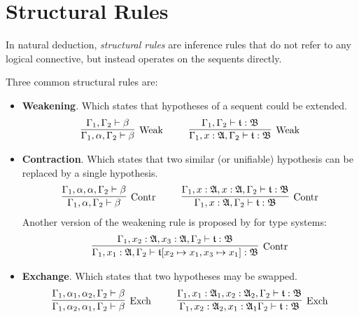 \section{Structural Rules}

In natural deduction, \textit{structural rules} are inference rules that do not refer to any logical connective, but instead operates on the sequents directly.

Three common structural rules are:
\begin{itemize}
    \item \textbf{Weakening}. Which states that hypotheses of a sequent could be extended.
    \begin{gather*}
        \infer[\mbox{Weak}]{\Gamma_1, \alpha, \Gamma_2 \vdash \beta}{\Gamma_1, \Gamma_2 \vdash \beta}
        ~~~~ ~~~~
        \infer[\mbox{Weak}]{\Gamma_1, x : \A, \Gamma_2\vdash \t : \mathfrak{B}}{\Gamma_1, \Gamma_2\vdash \t : \mathfrak{B}}
    \end{gather*}
    \item \textbf{Contraction}. Which states that two similar (or unifiable) hypothesis can be replaced by a single hypothesis.
    \begin{gather*}
        \infer[\mbox{Contr}]{\Gamma_1, \alpha, \Gamma_2 \vdash \beta}{\Gamma_1, \alpha, \alpha, \Gamma_2 \vdash \beta}
        ~~~~ ~~~~
        \infer[\mbox{Contr}]{\Gamma_1, x : \A, \Gamma_2 \vdash \t : \mathfrak{B}}{\Gamma_1, x : \A, x : \A, \Gamma_2 \vdash \t : \mathfrak{B}}
    \end{gather*}
    Another version of the weakening rule is proposed by \cite{DavidWalker2004} for type systems:
    \begin{gather*}
        \infer[\mbox{Contr}]{\Gamma_1, x_1 : \A, \Gamma_2 \vdash \t[x_2 \mapsto x_1, x_3 \mapsto x_1] : \mathfrak{B}}{\Gamma_1, x_2 : \A, x_3 : \A, \Gamma_2 \vdash \t : \mathfrak{B}}
    \end{gather*}
    \item \textbf{Exchange}. Which states that two hypotheses may be swapped.
    \begin{gather*}
        \infer[\mbox{Exch}]{\Gamma_1, \alpha_2, \alpha_1, \Gamma_2 \vdash \beta}{\Gamma_1, \alpha_1, \alpha_2, \Gamma_2 \vdash \beta}
        ~~~~ ~~~~
        \infer[\mbox{Exch}]{\Gamma_1, x_2 : \A_2, x_1 : \A_1 \Gamma_2 \vdash \t : \mathfrak{B}}{\Gamma_1, x_1 : \A_1, x_2 : \A_2, \Gamma_2 \vdash \t : \mathfrak{B}}
    \end{gather*}
\end{itemize}

